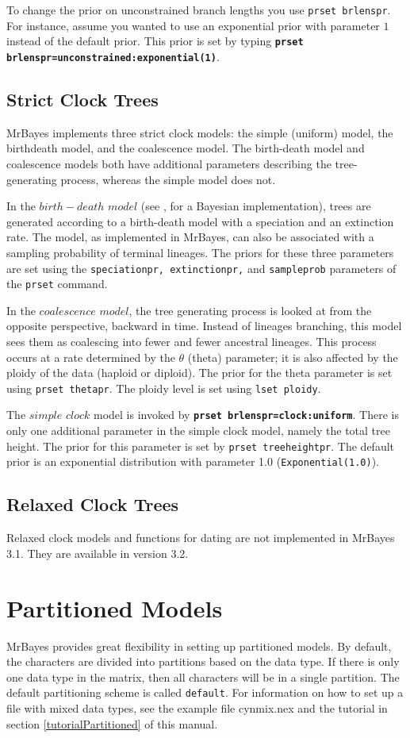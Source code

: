 \documentclass[12pt]{book}
\newcommand{\ttt}[1]{\texttt{#1}}
\newcommand{\tb}[1]{\ttt{\textbf{#1}}}
\begin{document}
To change the prior on unconstrained branch lengths you use \ttt{prset brlenspr}. For instance,
assume you wanted to use an exponential prior with parameter $1$ instead of the default prior. This
prior is set by typing \tb{prset brlenspr=unconstrained:exponential(1)}.

\subsection{Strict Clock Trees}

MrBayes implements three strict clock models: the simple (uniform) model, the birthdeath model, and
the coalescence model. The birth-death model and coalescence models both have additional parameters
describing the tree-generating process, whereas the simple model does not.

In the $birth-death$ $model$ (see \citet{yang97b}, for a Bayesian implementation), trees are
generated according to a birth-death model with a speciation and an extinction rate. The model, as
implemented in MrBayes, can also be associated with a sampling probability of terminal lineages.
The priors for these three parameters are set using the \ttt{speciationpr, extinctionpr,} and
\ttt{sampleprob} parameters of the \ttt{prset} command.

In the $coalescence$ $model$, the tree generating process is looked at from the opposite
perspective, backward in time. Instead of lineages branching, this model sees them as coalescing
into fewer and fewer ancestral lineages. This process occurs at a rate determined by the $\theta$
(theta) parameter; it is also affected by the ploidy of the data (haploid or diploid). The prior
for the theta parameter is set using \ttt{prset thetapr}. The ploidy level is set using \ttt{lset
ploidy}.

The $simple$ $clock$ model is invoked by \tb{prset brlenspr=clock:uniform}. There is only one
additional parameter in the simple clock model, namely the total tree height. The prior for this
parameter is set by \ttt{prset treeheightpr}. The default prior is an exponential distribution with
parameter 1.0 (\ttt{Exponential(1.0)}).

\subsection{Relaxed Clock Trees}
Relaxed clock models and functions for dating are not implemented in MrBayes 3.1. They are
available in version 3.2.

\section{Partitioned Models}
\label{partitionedModels}
MrBayes provides great flexibility in setting up partitioned models. By default, the characters are
divided into partitions based on the data type. If there is only one data type in the matrix, then
all characters will be in a single partition. The default partitioning scheme is called
\ttt{default}. For information on how to set up a file with mixed data types, see the example file
cynmix.nex and the tutorial in section \ref{tutorialPartitioned} of this manual.
\end{document}
